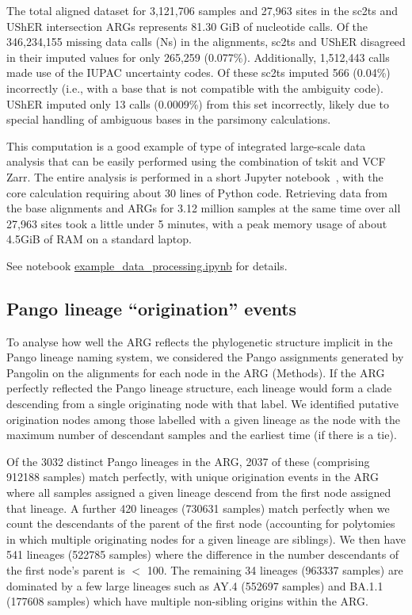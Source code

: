 \documentclass[12pt]{article}
\begin{document}
The total aligned dataset for 3,121,706 samples and 27,963 sites
in the sc2ts and UShER intersection ARGs represents
81.30 GiB of nucleotide calls.
Of the 346,234,155 missing data calls (Ns) in the alignments,
sc2ts and UShER disagreed in their imputed values for only 265,259 (0.077\%).
Additionally, 1,512,443 calls made use of the IUPAC uncertainty codes.
Of these sc2ts imputed 566 (0.04\%) incorrectly
(i.e., with a base that is not compatible with the ambiguity code).
UShER imputed only 13 calls (0.0009\%) from this set incorrectly,
likely due to special handling of
ambiguous bases in the parsimony calculations.

This computation is a good example of
type of integrated large-scale data analysis
that can be easily performed using the combination of tskit and VCF Zarr.
The entire analysis is performed in a short Jupyter
notebook~\cite{kluyver2016jupyter},
with the core calculation requiring about 30 lines of Python code.
Retrieving data from the base alignments and ARGs for 3.12 million samples
at the same time over all 27,963 sites took a little under 5 minutes,
with a peak memory usage of about 4.5GiB of RAM
on a standard laptop.

See notebook
\href{https://github.com/jeromekelleher/sc2ts-paper/blob/main/notebooks/example\_data\_processing.ipynb}{example\_data\_processing.ipynb}
for details.

\subsection{Pango lineage ``origination'' events}
\label{sec:supplement_pango_lineages}

To analyse how well the ARG reflects the phylogenetic structure implicit in the
Pango lineage naming system, we considered the Pango assignments generated by
Pangolin on the alignments for each node in the ARG (Methods). If the ARG
perfectly reflected the Pango lineage structure, each lineage would form a
clade descending from a single originating node with that label. We identified
putative origination nodes among those labelled with a given lineage as the node
with the maximum number of descendant samples and the earliest time (if there
is a tie).

Of the 3032 distinct Pango lineages in the ARG, 2037 of these (comprising
912188 samples) match perfectly, with unique origination events in the ARG
where all samples assigned a given lineage descend from the first node assigned
that lineage. A further 420 lineages (730631 samples) match perfectly when we
count the descendants of the parent of the first node (accounting for
polytomies in which multiple originating nodes for a given lineage are
siblings). We then have 541 lineages (522785 samples) where the difference in
the number descendants of the first node's parent is $<$ 100. The remaining 34
lineages (963337 samples) are dominated by a few large lineages such as AY.4
(552697 samples) and BA.1.1 (177608 samples) which have multiple non-sibling
origins within the ARG.
\end{document}
